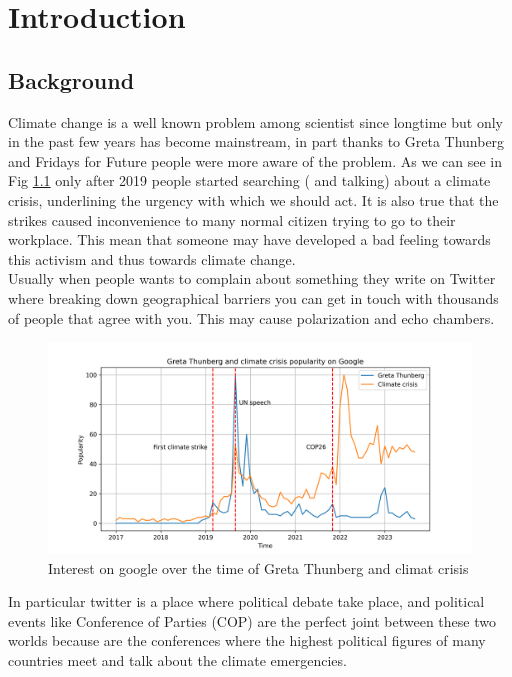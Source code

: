 
\chapter{Introduction}  %

\ifpdf
    \graphicspath{{Chapter1/Figs/Raster/}{Chapter1/Figs/PDF/}{Chapter1/Figs/}}
\else
    \graphicspath{{Chapter1/Figs/Vector/}{Chapter1/Figs/}}
\fi
\section{Background}
Climate change is a well known problem among scientist since longtime but only in the past few years has become mainstream, in part thanks to Greta Thunberg and Fridays for Future people were more aware of the problem. As we can see in Fig \ref{fig:google_greta} only after 2019 people started searching ( and talking) about a climate crisis, underlining  the urgency with which we should act. It is also true that the strikes   caused inconvenience to many normal citizen trying to go to their workplace. This mean that someone may have developed a bad feeling towards this activism and thus towards climate change.
\\

Usually when people wants to complain about something they write on Twitter  where breaking down geographical barriers you can get in touch with thousands of people that agree with you. This may cause polarization and echo chambers.

\begin{figure}
    \centering
    \includegraphics[width=0.85\linewidth]{Chapter1/figures/greta_climate_crisis.png}
    \caption{Interest on google over the time of Greta Thunberg and climat crisis}
    \label{fig:google_greta}
\end{figure}
In particular twitter is a place where political debate take place, and political events like 
Conference of Parties (COP) are the perfect joint between these two worlds because are the conferences where the highest political figures of many countries meet and talk about the climate emergencies. 



